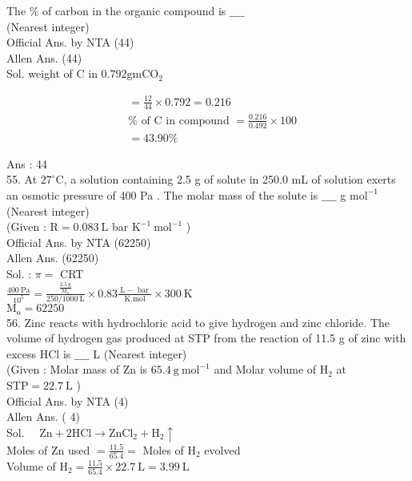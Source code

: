 \documentclass[10pt]{article}
\begin{document}
The \% of carbon in the organic compound is \(\_\_\_\_\)\\
(Nearest integer)\\
Official Ans. by NTA (44)\\
Allen Ans. (44)\\
Sol. weight of C in \(0.792 \mathrm{gm} \mathrm{CO}_{2}\)

\[
\begin{aligned}
& =\frac{12}{44} \times 0.792=0.216 \\
& \% \text { of } \mathrm{C} \text { in compound }=\frac{0.216}{0.492} \times 100 \\
& =43.90 \%
\end{aligned}
\]

Ans : 44\\
55. At \(27^{\circ} \mathrm{C}\), a solution containing 2.5 g of solute in 250.0 mL of solution exerts an osmotic pressure of 400 Pa . The molar mass of the solute is \(\_\_\_\_\) g \(\mathrm{mol}^{-1}\) (Nearest integer)\\
(Given : \(\mathrm{R}=0.083 \mathrm{~L}\) bar \(\mathrm{K}^{-1} \mathrm{~mol}^{-1}\) )\\
Official Ans. by NTA (62250)\\
Allen Ans. (62250)\\
Sol. : \(\pi=\) CRT\\
\(\frac{400 \mathrm{~Pa}}{10^{5}}=\frac{\frac{2.5 \mathrm{~g}}{\mathrm{M}_{\mathrm{o}}}}{250 / 1000 \mathrm{~L}} \times 0.83 \frac{\mathrm{~L}-\text { bar }}{\text { K.mol }} \times 300 \mathrm{~K}\)\\
\(\mathrm{M}_{\mathrm{o}}=62250\)\\
56. Zinc reacts with hydrochloric acid to give hydrogen and zinc chloride. The volume of hydrogen gas produced at STP from the reaction of 11.5 g of zinc with excess HCl is \(\_\_\_\_\) L (Nearest integer)\\
(Given : Molar mass of Zn is \(65.4 \mathrm{~g} \mathrm{~mol}^{-1}\) and Molar volume of \(\mathrm{H}_{2}\) at \(\mathrm{STP}=22.7 \mathrm{~L}\) )\\
Official Ans. by NTA (4)\\
Allen Ans. ( 4)\\
Sol. \(\quad \mathrm{Zn}+2 \mathrm{HCl} \rightarrow \mathrm{ZnCl}_{2}+\mathrm{H}_{2} \uparrow\)\\
Moles of Zn used \(=\frac{11.5}{65.4}=\) Moles of \(\mathrm{H}_{2}\) evolved\\
Volume of \(\mathrm{H}_{2}=\frac{11.5}{65.4} \times 22.7 \mathrm{~L}=3.99 \mathrm{~L}\)\\
\end{document}
